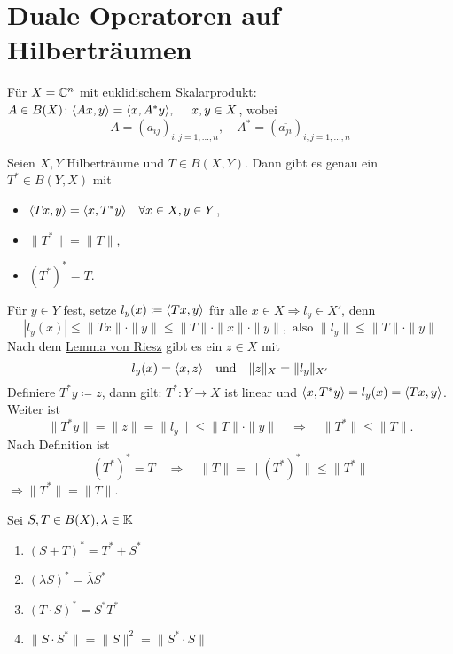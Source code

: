


\section{Duale Operatoren auf Hilberträumen}



Für $X = \mathbb{C}^{n}$ mit euklidischem Skalarprodukt: \\
$A \in B(X) \colon \< A x , y \> = \< x , A^{*} y \>, \quad x, y \in X$, wobei
\[ A = (a_{ij})_{i, j = 1, \dotsc, n}, \quad A^{*} = (\overline{a_{ji}})_{i, j = 1, \dotsc, n} \]


\begin{satz}
	Seien $X, Y$ Hilberträume und $T \in B(X, Y)$. Dann gibt es genau ein $T^{*} \in B(Y, X)$ mit
	\begin{itemize}
		\item $\langle T x , y \rangle = \langle x , T^{*} y \rangle \quad \forall x \in X, y \in Y$,
		\item $\| T^{*} \| = \| T \|$,
		\item $\left(T	^{*}\right)^{*} = T$.
	\end{itemize}	
\end{satz}

\begin{beweis}
	Für $y \in Y$ fest, setze $l_{y}(x) \coloneqq \langle T x , y \rangle$ für alle $x \in X \Rightarrow l_{y} \in X'$, denn
	\[ | l_{y}(x) | \leq \| T x \| \cdot \| y \| \leq \|T \| \cdot \| x \| \cdot \| y \|, \text{ also } \| l_{y} \| \leq \| T \| \cdot \| y \| \]
	Nach dem \hyperref[lemma:6.3-Riesz]{Lemma von Riesz} gibt es ein $z \in X$ mit
	\[ l_{y} (x) = \langle x , z \rangle \quad \text{und} \quad \| z \|_{X} = \| l_{y} \|_{X'} \]
	Definiere $T^{*} y \coloneqq z$, dann gilt: $T^{*} \colon Y \rightarrow X$ ist linear und $\langle x , T^{*} y \rangle = l_{y}(x) = \langle T x , y \rangle$. \\
	Weiter ist 
	\[ \| T^{*} y \| = \| z \| = \| l_{y} \| \leq \| T \| \cdot \| y \| \quad \Rightarrow \quad \| T^{*} \| \leq \| T \|. \]
	Nach Definition ist 
	\[ \left( T^{*} \right)^{*} = T \quad \Rightarrow \quad \| T \| = \| \left( T^{*} \right)^{*} \| \leq \| T^{*} \| \]
	$\Rightarrow \| T^{*} \| = \| T \|$. 
\end{beweis}


\begin{bemerkung} \label{bem:19.2}
	Sei $S, T \in B(X), \lambda \in \mathbb{K}$
	\begin{enumerate}[label=\alph*\upshape)]
		\item $\left( S + T \right)^{*} = T^{*} + S^{*}$
		\item $\left( \lambda S \right)^{*} = \overline{\lambda} S^{*}$
		\item $\left( T \cdot S \right)^{*} = S^{*} T^{*}$
		\item $\| S \cdot S^{*} \| = \| S \|^{2} = \| S^{*} \cdot S \|$
	\end{enumerate}
\end{bemerkung}

